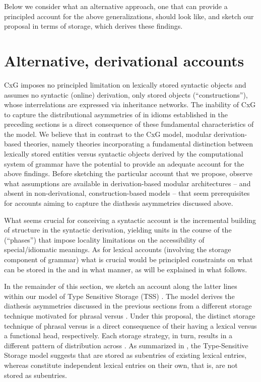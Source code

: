 \documentclass[output=paper,
modfonts
]{LSP/langsci}
\begin{document}
Below we consider what an alternative approach, one that can provide a
principled account for the above generalizations, should look like, and
sketch our proposal in terms of  storage, which derives these findings.

\section{Alternative, derivational accounts}\label{sec:horvath:5}

CxG imposes no principled limitation on lexically stored syntactic
objects and assumes no syntactic (online) derivation, only stored
objects (``constructions''), whose interrelations are expressed via
inheritance networks. The inability of CxG to capture the distributional
asymmetries of  in idioms established in the preceding sections
is a direct consequence of these fundamental characteristics of the
model. We believe that in contrast to the CxG model, modular
derivation-based theories, namely theories incorporating a fundamental
distinction between lexically stored entities versus syntactic objects
derived by the computational system of grammar have the potential to
provide an adequate account for the above findings. Before sketching the
particular account that we propose, observe what assumptions are
available in derivation-based modular architectures -- and absent in
non-derivational, construction-based models -- that seem prerequisites
for accounts aiming to capture the diathesis asymmetries discussed
above.

What seems crucial for conceiving a syntactic account is the incremental
building of structure in the syntactic derivation, yielding units in the
course of the  (``phases'') that impose locality limitations on
the accessibility of special/idiomatic meanings. As for lexical accounts
(involving the storage component of grammar) what is crucial would be
principled constraints on what can be stored in the  and in what
manner, as will be explained in what follows.

In the remainder of this section, we sketch an account along the latter
lines within our model of Type Sensitive Storage (TSS) \citep{horvath2016}. The model derives the diathesis asymmetries discussed in
the previous sections from a different storage technique motivated for
phrasal versus . Under this proposal, the distinct storage
technique of phrasal versus  is a direct consequence of
their having a lexical versus a functional head, respectively. Each
storage strategy, in turn, results in a different pattern of
distribution across . As summarized in , the Type-Sensitive
Storage model suggests that  are stored as subentries of
existing lexical entries, whereas  constitute independent
lexical entries on their own, that is, are not stored as subentries.
\end{document}

